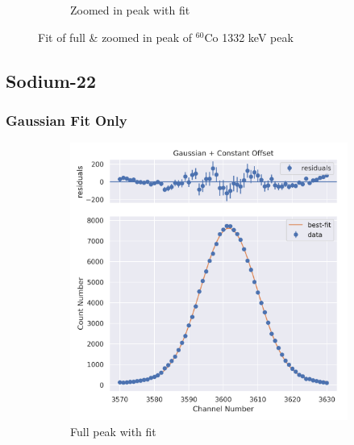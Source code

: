 \documentclass[11pt,a4paper]{article}
\newcommand{\element}[2]{$^{#2}\textrm{#1}$}
\begin{document}
\begin{figure}[H]
\begin{subfigure}{.5\linewidth}
    \caption{Zoomed in peak with fit}
  \end{subfigure}
  \caption{Fit of full \& zoomed in peak of \element{Co}{60} 1332 keV peak}
\end{figure}
\clearpage
\subsection{Sodium-22}
\subsubsection{Gaussian Fit Only}
\begin{figure}[H]
  \centering
  \begin{subfigure}{.5\linewidth}
    \centering
    \includegraphics[width=\linewidth]{./Images/Sodium22/Gauss/Gauss_1_Full.png}
    \caption{Full peak with fit}
  \end{subfigure}%
  \begin{subfigure}{.5\linewidth}
    \centering

\end{subfigure}
\end{figure}
\end{document}
